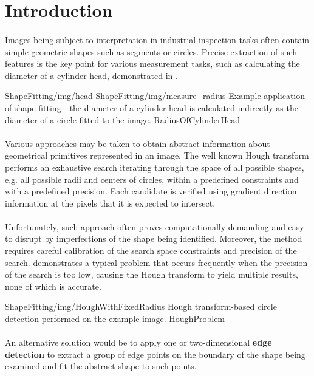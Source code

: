 \section{Introduction}

\paragraph*{}
Images being subject to interpretation in industrial inspection tasks often contain simple geometric shapes such as segments or circles. Precise extraction of such features is the key point for various measurement tasks, such as calculating the diameter of a cylinder head, demonstrated in .

\twoFigures
{ShapeFitting/img/head}
{ShapeFitting/img/measure_radius}
{Example application of shape fitting - the diameter of a cylinder head is calculated indirectly as the diameter of a circle fitted to the image.}
{RadiusOfCylinderHead}
{\basicWidth}


\paragraph*{}
Various approaches may be taken to obtain abstract information about geometrical primitives represented in an image. The well known Hough transform performs an exhaustive search iterating through the space of all possible shapes, e.g. all possible radii and centers of circles, within a predefined constraints and with a predefined precision. Each candidate is verified using gradient direction information at the pixels that it is expected to intersect.

\paragraph*{}
Unfortunately, such approach often proves computationally demanding and easy to disrupt by imperfections of the shape being identified. Moreover, the method requires careful calibration of the search space constraints and precision of the search.  demonstrates a typical problem that occurs frequently when the precision of the search is too low, causing the Hough transform to yield multiple results, none of which is accurate.

\oneFigure
{ShapeFitting/img/HoughWithFixedRadius}
{Hough transform-based circle detection performed on the example image.}
{HoughProblem}
{\basicWidth}

\paragraph*{}
An alternative solution would be to apply one or two-dimensional \textbf{edge detection} to extract a group of edge points on the boundary of the shape being examined and fit the abstract shape to such points.


